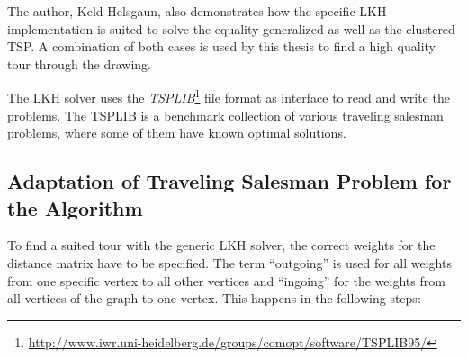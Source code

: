 The author, Keld Helsgaun, also demonstrates how the specific LKH implementation is suited to solve the equality generalized\citep{helsgaun2013equality} as well as the clustered TSP\cite{helsgaun2014solving}. A combination of both cases is used by this thesis to find a high quality tour through the drawing.

The LKH solver uses the \textit{TSPLIB}\footnote{\url{http://www.iwr.uni-heidelberg.de/groups/comopt/software/TSPLIB95/}} file format as interface to read and write the problems. The TSPLIB is a benchmark collection of various traveling salesman problems, where some of them have known optimal solutions.

\subsection{Adaptation of Traveling Salesman Problem for the Algorithm}

To find a suited tour with the generic LKH solver, the correct weights for the distance matrix have to be specified. The term \enquote{outgoing} is used for all weights from one specific vertex to all other vertices and \enquote{ingoing} for the weights from all vertices of the graph to one vertex. This happens in the following steps:

